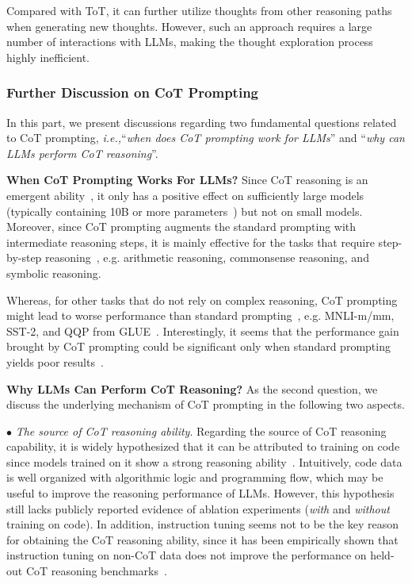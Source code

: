 {{{{{{{Compared with ToT, it can further utilize thoughts from other reasoning paths when generating new thoughts.} However, such an approach requires a large number of interactions with LLMs, making the thought exploration process highly inefficient. } 

\subsubsection{Further Discussion on CoT Prompting} In this part, we present discussions regarding two fundamental questions related to CoT prompting, \emph{i.e.,}``\textit{when does CoT prompting work for LLMs}'' and ``\textit{why can LLMs perform CoT reasoning}''.

\textbf{{When CoT Prompting Works For LLMs?}} Since CoT reasoning is an emergent ability~\cite{Wei-arxiv-2022-Emergent}, it only has a positive effect on sufficiently large models (typically containing 10B or more parameters~\cite{Wei-arxiv-2022-chain}) but not on small models. Moreover, since CoT prompting augments the standard prompting with intermediate reasoning steps, it is mainly effective for the tasks that require step-by-step reasoning~\cite{Wei-arxiv-2022-chain}, e.g. arithmetic reasoning, commonsense reasoning, and symbolic reasoning.

Whereas, for other tasks that do not rely on complex reasoning, CoT prompting might lead to worse performance than standard prompting~\cite{Wang-arxiv-2022-Rationale}, e.g. MNLI-m/mm, SST-2, and QQP from GLUE~\cite{Wang-EMNLP-2018-GLUE}. Interestingly, it seems that the performance gain brought by CoT prompting could be significant only when standard prompting yields poor results~\cite{Wei-arxiv-2022-chain}.

\textbf{{Why LLMs Can Perform CoT Reasoning?}} As the second question, we discuss the underlying mechanism of CoT prompting in the following two aspects. 

$\bullet$ \emph{The source of CoT reasoning ability}. Regarding the source of CoT reasoning capability, it is widely hypothesized that it can be attributed to training on code since models trained on it show a strong reasoning ability~\cite{Liang-arxiv-2022-Holistic, FU-blog-2022-how, Bi-arxiv-2023-When}. Intuitively, code data is well organized with algorithmic logic and programming flow, which may be useful to improve the reasoning performance of LLMs. However, this hypothesis still lacks publicly reported evidence of ablation experiments (\emph{with} and \emph{without} training on code). In addition, instruction tuning seems not to be the key reason for obtaining the CoT reasoning ability, since it has been empirically shown that instruction tuning on non-CoT data does not improve the performance on held-out CoT reasoning benchmarks~\cite{Chung-arxiv-2022-Scaling}.

}}}}}
